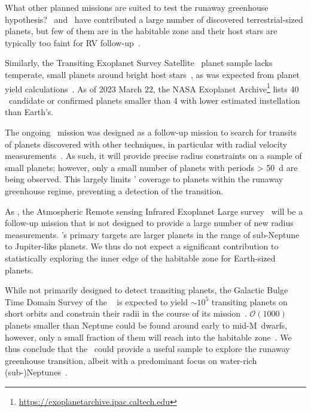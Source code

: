 \documentclass[twocolumn,twocolappendix]{aastex631}
\begin{document}
What other planned missions are suited to test the runaway greenhouse hypothesis?
\kepler\ and \ktwo\ have contributed a large number of discovered terrestrial-sized planets, but few of them are in the habitable zone and their host stars are typically too faint for RV follow-up~\citep{Dressing2015}.

Similarly, the Transiting Exoplanet Survey Satellite~\citep[\tess,][]{Ricker2014a} planet sample lacks temperate, small planets around bright host stars~\citep{Ment2023}, as was expected from planet yield calculations~\citep{Barclay2018}.
As of 2023 March 22, the NASA Exoplanet Archive\footnote{\url{https://exoplanetarchive.ipac.caltech.edu}} lists 40 \tess\ candidate or confirmed planets smaller than \SI{4}{\rEarth} with lower estimated instellation than Earth's.

The ongoing \cheops\ mission was designed as a follow-up mission to search for transits of planets discovered with other techniques, in particular with radial velocity measurements~\citep{Benz2021}.
As such, it will provide precise radius constraints on a sample of small planets; however, only a small number of planets with periods \SI{> 50}{\day} are being observed.
This largely limits \cheops' coverage to planets within the runaway greenhouse regime, preventing a detection of the transition.

As \cheops, the Atmospheric Remote sensing Infrared Exoplanet Large survey~\citep[\ariel,][]{Puig2016} will be a follow-up mission that is not designed to provide a large number of new radius measurements.
\ariel's primary targets are larger planets in the range of sub-Neptune to Jupiter-like planets.
We thus do not expect a significant contribution to statistically exploring the inner edge of the habitable zone for Earth-sized planets.

While not primarily designed to detect transiting planets, the Galactic Bulge Time Domain Survey of the \rst~\citep{Spergel2015} is expected to yield $\sim 10^5$ transiting planets on short orbits and constrain their radii in the course of its mission~\citep{Montet2017}.
$\mathcal{O} (1000)$ planets smaller than Neptune could be found around early to mid-M~dwarfs, however, only a small fraction of them will reach into the habitable zone~\citep{Tamburo2023}.
We thus conclude that the \rst\ could provide a useful sample to explore the runaway greenhouse transition, albeit with a predominant focus on water-rich (sub-)Neptunes~\citep[e.g.,][]{Pierrehumbert2022}.
\end{document}
